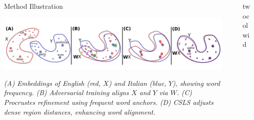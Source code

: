 \documentclass[final]{beamer}
\newlength{\sepwid}
\newlength{\onecolwid}
\newlength{\twocolwid}
\begin{document}
\begin{frame}[t]
\begin{columns}[t]
\begin{column}{\onecolwid}

\begin{block}{Method Illustration}
\begin{center}
    \includegraphics[width=0.9\linewidth]{figures/figure1.png}
\end{center}
\small
\textit{(A) Embeddings of English (red, \(X\)) and Italian (blue, \(Y\)), showing word frequency. (B) Adversarial training aligns \(X\) and \(Y\) via \(W\). (C) Procrustes refinement using frequent word anchors. (D) CSLS adjusts dense region distances, enhancing word alignment.}
\end{block}

\end{column} 

\begin{column}{\sepwid}\end{column} 

\begin{column}{twocolwid}

\begin{columns}[t,totalwidth=\twocolwid]

\begin{column}{\onecolwid}



\end{column}
\end{columns}
\end{column}
\end{columns}
\end{frame}
\end{document}
